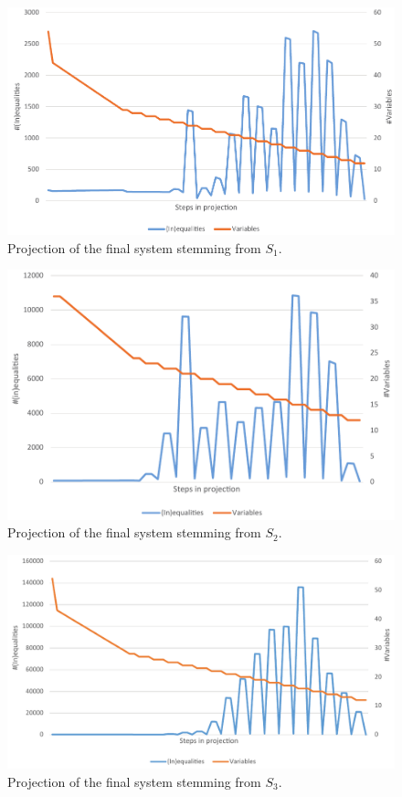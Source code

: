 \begin{figure}[p]
	\centering
		\includegraphics[scale=0.6]{figures/FinalProjection-29-2Shear.pdf}
	\caption{Projection of the final system stemming from $S_1$. }
	\label{fig:FinalProjectionS1}
\end{figure}

\begin{figure}[p]
	\centering
		\includegraphics[scale=0.6]{figures/FinalProjection-24.pdf}
	\caption{Projection of the final system stemming from $S_2$. }
	\label{fig:FinalProjectionS2}
\end{figure}

\begin{figure}[p]
	\centering
		\includegraphics[scale=0.6]{figures/FinalProjection-30.pdf}
	\caption{Projection of the final system stemming from $S_3$. }
	\label{fig:FinalProjectionS3}
\end{figure}

